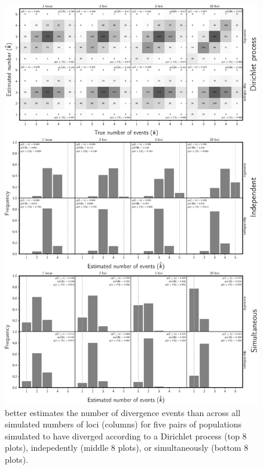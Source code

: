 \begin{figure}[htbp]
    \begin{center}
        \includegraphics[width=\textwidth,height=0.9\textheight,keepaspectratio]{../images/from-project-repo/plots/tex-plot-grids/grid-nevents-cropped.pdf}
        \caption{
            \scriptsize
            \Ecoevolity better estimates the number of divergence
            events than \dppmsbayes across all simulated numbers of
            loci (columns) for five pairs of populations simulated to have
            diverged according to a Dirichlet process (top 8 plots),
            indepedently (middle 8 plots),
            or
            simultaneously (bottom 8 plots).
            \neventsshadingdescription{}
            \neventsplotannotations{}
        }
        \label{fig:neventsdp}
    \end{center}
\end{figure}

